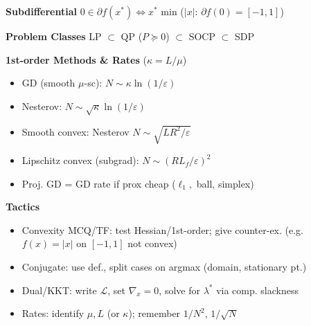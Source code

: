 \textbf{Subdifferential}
\(0\in\partial f(x^*)\iff x^*\) min (\(|x|\): \(\partial f(0)=[-1,1]\))

\textbf{Problem Classes}
LP \(\subset\) QP (\(P\succeq0\)) \(\subset\) SOCP \(\subset\) SDP

\textbf{1st-order Methods \& Rates} (\(\kappa=L/\mu\))
\begin{itemize}
  \item GD (smooth \(\mu\)-sc): \(N\sim\kappa\ln(1/\varepsilon)\)
  \item Nesterov: \(N\sim\sqrt\kappa\ln(1/\varepsilon)\)
  \item Smooth convex: Nesterov \(N\sim\sqrt{LR^2/\varepsilon}\)
  \item Lipschitz convex (subgrad): \(N\sim(RL_f/\varepsilon)^2\)
  \item Proj. GD = GD rate if prox cheap (\(\ell_1,\) ball, simplex)
\end{itemize}

\textbf{Tactics}
\begin{itemize}
  \item Convexity MCQ/TF: test Hessian/1st-order; give counter-ex.
    (e.g. \(f(x)=|x|\) on \([-1,1]\) not convex)
  \item Conjugate: use def., split cases on argmax (domain, stationary pt.)
  \item Dual/KKT: write \(\mathcal L\), set \(\nabla_x=0\), solve for
    \(\lambda^*\) via comp. slackness
  \item Rates: identify \(\mu,L\) (or \(\kappa\)); remember
    \(1/N^2\), \(1/\sqrt N\)
\end{itemize}

